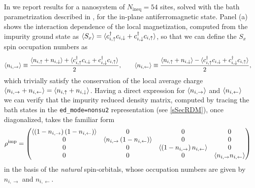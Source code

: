 \documentclass[edipack_sp.tex]{subfiles}
\begin{document}
In  we report results for a nanosystem of 
$N_\mathrm{ineq}=54$ sites, solved with the bath parametrization 
described in , for the in-plane 
antiferromagnetic state.
Panel (a) shows the interaction dependence of the local magnetization,
computed from the impurity ground state as  
$ \langle S_x \rangle = \langle c^\dagger_{i,\uparrow} c_{i,\downarrow} + c^\dagger_{i,\downarrow} c_{i,\uparrow} \rangle$,
so that we can define the $S_x$ spin occupation numbers as
\begin{equation*}
    \langle n_{i,\rightarrow} \rangle \equiv \frac{\langle n_{i,\uparrow} + n_{i,\downarrow} \rangle +
    \langle c^\dagger_{i,\uparrow} c_{i,\downarrow} + c^\dagger_{i,\downarrow} c_{i,\uparrow} \rangle}{2},
    \qquad
    \langle n_{i,\leftarrow} \rangle \equiv \frac{\langle n_{i,\uparrow} + n_{i,\downarrow} \rangle -
    \langle c^\dagger_{i,\uparrow} c_{i,\downarrow} + c^\dagger_{i,\downarrow} c_{i,\uparrow} \rangle}{2},
\end{equation*}
which trivially satisfy the conservation of the local average charge $\langle n_{i,\rightarrow} + n_{i,\leftarrow} \rangle = \langle n_{i,\uparrow} + n_{i,\downarrow} \rangle$.
Having a direct expression for $\langle n_{i,\rightarrow} \rangle$ and $\langle n_{i,\leftarrow} \rangle$
we can verify that the impurity reduced density matrix, computed by 
tracing the bath states in the \texttt{ed\_mode=nonsu2} representation 
(see \ref{sSecRDM}), once diagonalized, takes the familiar form
\cite{XiDai2013,WalshLetter2019,BellomiaPhD,BellomiaKMH,Bellomia_intracorr} 
\begin{equation}
    \rho^\mathrm{imp} = 
     \begin{pmatrix}
            \left\langle\left(1-n_{i,\rightarrow}\right)\left(1-n_{i,\leftarrow}\right)\right\rangle   &    0          &       0       &   0 \\
                    0       &    \left\langle n_{i,\rightarrow}\left(1-n_{i,\leftarrow}\right)\right\rangle  &       0       &   0 \\
                   0       &       0   &    \left\langle\left(1-n_{i,\rightarrow}\right)n_{i,\leftarrow}\right\rangle      &   0 \\
                    0       &       0   &       0          &    \left\langle n_{i,\rightarrow} n_{i,\leftarrow}\right\rangle
        \end{pmatrix} 
\end{equation}
in the basis of the {\it natural} spin-orbitals, whose occupation numbers
are given by $n_{i,\rightarrow}$ and $n_{i,\leftarrow}$.
\end{document}
